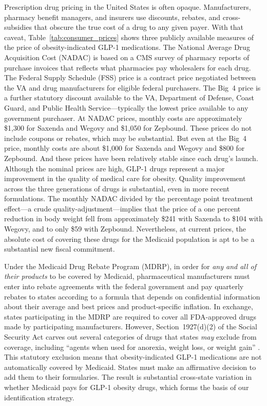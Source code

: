 Prescription drug pricing in the United States is often opaque. Manufacturers, pharmacy benefit managers, and insurers use discounts, rebates, and cross-subsidies that obscure the true cost of a drug to any given payer. With that caveat, Table~\ref{tab:consumer_prices} shows three publicly available measures of the price of obesity-indicated GLP-1 medications. The National Average Drug Acquisition Cost (NADAC) is based on a CMS survey of pharmacy reports of purchase invoices that reflects what pharmacies pay wholesalers for each drug. The Federal Supply Schedule (FSS) price is a contract price negotiated between the VA and drug manufacturers for eligible federal purchasers. The Big~4 price is a further statutory discount available to the VA, Department of Defense, Coast Guard, and Public Health Service---typically the lowest price available to any government purchaser. At NADAC prices, monthly costs are approximately \$1,300 for Saxenda and Wegovy and \$1,050 for Zepbound. These prices do not include coupons or rebates, which may be substantial. But even at the Big~4 price, monthly costs are about \$1,000 for Saxenda and Wegovy and  \$800 for Zepbound. And these prices have been relatively stable since each drug's launch. Although the nominal prices are high, GLP-1 drugs represent a major improvement in the quality of medical care for obesity. Quality improvement across the three generations of drugs is substantial, even in more recent formulations. The monthly NADAC divided by the percentage point treatment effect---a crude quality-adjustment---implies that the price of a one percent reduction in body weight fell from approximately \$241 with Saxenda to \$104 with Wegovy, and to only \$59 with Zepbound. Nevertheless, at current prices, the absolute cost of covering these drugs for the Medicaid population is apt to be a substantial new fiscal commitment.

Under the Medicaid Drug Rebate Program (MDRP), in order for \emph{any and all of their products} to be covered by Medicaid, pharmaceutical manufacturers must enter into rebate agreements with the federal government and pay quarterly rebates to states according to a formula that depends on confidential information about their average and best prices and product-specific inflation. In exchange, states participating in the MDRP are required to cover all FDA-approved drugs made by participating manufacturers. However, Section~1927(d)(2) of the Social Security Act carves out several categories of drugs that states \emph{may} exclude from coverage, including ``agents when used for anorexia, weight loss, or weight gain'' \citep{SSA1927}. This statutory exclusion means that obesity-indicated GLP-1 medications are not automatically covered by Medicaid. States must make an affirmative decision to add them to their formularies. The result is substantial cross-state variation in whether Medicaid pays for GLP-1 obesity drugs, which forms the basis of our identification strategy.

